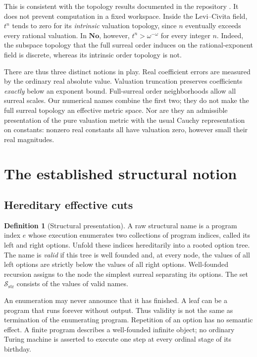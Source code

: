 \documentclass[11pt,letterpaper]{article}
\numberwithin{equation}{section}
\theoremstyle{definition}
\newtheorem{definition}[theorem]{Definition}
\theoremstyle{remark}
\newcommand{\No}{\mathbf{No}}
\newcommand{\Sc}{\mathcal S_{\mathrm{str}}}
\begin{document}
This is consistent with the topology results documented in the repository
\cite{repo}. It does not prevent computation in a fixed workspace. Inside
the Levi--Civita field, $t^n$ tends to zero for its \emph{intrinsic}
valuation topology, since $n$ eventually exceeds every rational valuation.
In $\No$, however, $t^n>\omega^{-\omega}$ for every integer $n$.
Indeed, the subspace topology that the full surreal order induces on the
rational-exponent field is discrete, whereas its intrinsic order topology
is not.

There are thus three distinct notions in play. Real coefficient errors are
measured by the ordinary real absolute value. Valuation truncation preserves
coefficients \emph{exactly} below an exponent bound. Full-surreal order
neighborhoods allow all surreal scales. Our numerical names combine the
first two; they do not make the full surreal topology an effective metric
space. Nor are they an admissible presentation of the pure valuation metric
with the usual Cauchy representation on constants: nonzero real constants
all have valuation zero, however small their real magnitudes.

\section{The established structural notion}
\label{sec:structural}

\subsection{Hereditary effective cuts}

\begin{definition}[Structural presentation]
\label{def:structural}
A raw structural name is a program index $e$ whose execution enumerates two
collections of program indices, called its left and right options. Unfold
these indices hereditarily into a rooted option tree. The name is
\emph{valid} if this tree is well founded and, at every node, the values of
all left options are strictly below the values of all right options.
Well-founded recursion assigns to the node the simplest surreal separating
its options. The set $\Sc$ consists of the values of valid names.
\end{definition}

An enumeration may never announce that it has finished. A leaf can be a
program that runs forever without output. Thus validity is not the same as
termination of the enumerating program. Repetition of an option has no
semantic effect. A finite program describes a well-founded infinite object;
no ordinary Turing machine is asserted to execute one step at every ordinal
stage of its birthday.
\end{document}
